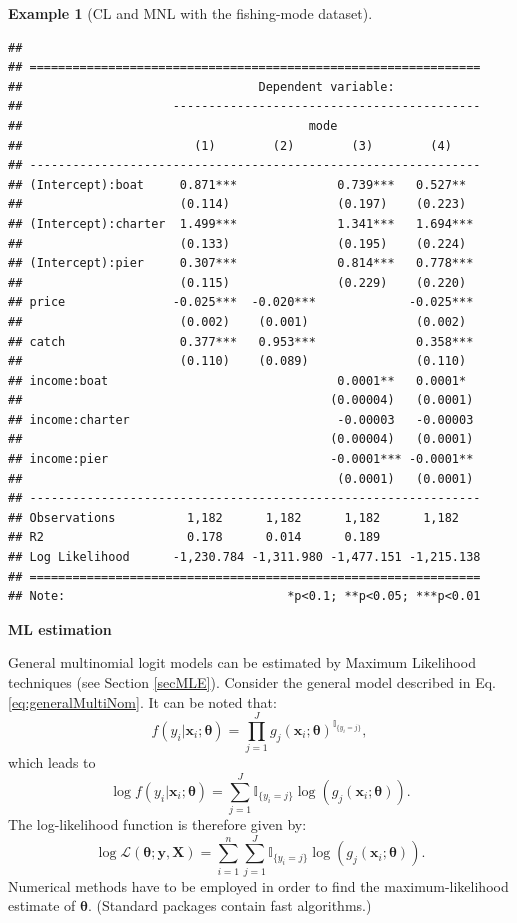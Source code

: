 \documentclass[
  12pt,
]{book}
\theoremstyle{definition}
\theoremstyle{definition}
\newtheorem{example}{Example}[chapter]
\theoremstyle{definition}
\theoremstyle{definition}
\theoremstyle{remark}
\begin{document}
\begin{example}[CL and MNL with the fishing-mode dataset]
\begin{verbatim}
## 
## ===============================================================
##                                 Dependent variable:            
##                     -------------------------------------------
##                                        mode                    
##                        (1)        (2)        (3)        (4)    
## ---------------------------------------------------------------
## (Intercept):boat     0.871***              0.739***   0.527**  
##                      (0.114)               (0.197)    (0.223)  
## (Intercept):charter  1.499***              1.341***   1.694*** 
##                      (0.133)               (0.195)    (0.224)  
## (Intercept):pier     0.307***              0.814***   0.778*** 
##                      (0.115)               (0.229)    (0.220)  
## price               -0.025***  -0.020***             -0.025*** 
##                      (0.002)    (0.001)               (0.002)  
## catch                0.377***   0.953***              0.358*** 
##                      (0.110)    (0.089)               (0.110)  
## income:boat                                0.0001**   0.0001*  
##                                           (0.00004)   (0.0001) 
## income:charter                             -0.00003   -0.00003 
##                                           (0.00004)   (0.0001) 
## income:pier                               -0.0001*** -0.0001** 
##                                            (0.0001)   (0.0001) 
## ---------------------------------------------------------------
## Observations          1,182      1,182      1,182      1,182   
## R2                    0.178      0.014      0.189              
## Log Likelihood      -1,230.784 -1,311.980 -1,477.151 -1,215.138
## ===============================================================
## Note:                               *p<0.1; **p<0.05; ***p<0.01
\end{verbatim}

\end{example}

\textbf{ML estimation}

General multinomial logit models can be estimated by Maximum Likelihood techniques (see Section \ref{secMLE}). Consider the general model described in Eq. \eqref{eq:generalMultiNom}. It can be noted that:
\[
f(y_i|\mathbf{x}_i;\boldsymbol\theta) = \prod_{j=1}^J g_j(\mathbf{x}_i;\boldsymbol\theta)^{\mathbb{I}_{\{y_i=j\}}},
\]
which leads to
\[
\log f(y_i|\mathbf{x}_i;\boldsymbol\theta) = \sum_{j=1}^J \mathbb{I}_{\{y_i=j\}} \log \left(g_j(\mathbf{x}_i;\boldsymbol\theta)\right).
\]
The log-likelihood function is therefore given by:
\begin{equation}
\log \mathcal{L}(\boldsymbol\theta;\mathbf{y},\mathbf{X}) = \sum_{i=1}^n  \sum_{j=1}^J \mathbb{I}_{\{y_i=j\}} \log \left(g_j(\mathbf{x}_i;\boldsymbol\theta)\right).\label{eq:multipleLogLik}
\end{equation}
Numerical methods have to be employed in order to find the maximum-likelihood estimate of \(\boldsymbol\theta\). (Standard packages contain fast algorithms.)
\end{document}
